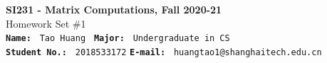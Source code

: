 \documentclass[english,onecolumn]{IEEEtran}
\begin{document}
\begin{center}
\textbf{SI231 - Matrix Computations, Fall 2020-21} \\ Homework Set \#1\\
\texttt{\textbf{Name:}}   	\texttt{ Tao Huang }  		\hspace{1bp}
\texttt{\textbf{Major:}}  	\texttt{ Undergraduate in CS } 	\\
\texttt{\textbf{Student No.:}} 	\texttt{ 2018533172}     \hspace{1bp}
\texttt{\textbf{E-mail:}} 	\texttt{ huangtao1@shanghaitech.edu.cn}
\par\end{center}









\end{document}
